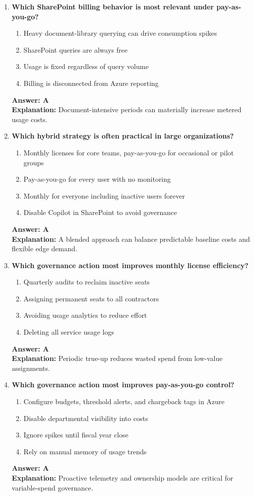 \documentclass[10pt]{article}
\begin{document}
\begin{enumerate}[leftmargin=*]
\item \textbf{Which SharePoint billing behavior is most relevant under pay-as-you-go?}
\begin{enumerate}[label=\Alph*.]
  \item Heavy document-library querying can drive consumption spikes
  \item SharePoint queries are always free
  \item Usage is fixed regardless of query volume
  \item Billing is disconnected from Azure reporting
\end{enumerate}
\textbf{Answer: A}\\
\textbf{Explanation:} Document-intensive periods can materially increase metered usage costs.

\item \textbf{Which hybrid strategy is often practical in large organizations?}
\begin{enumerate}[label=\Alph*.]
  \item Monthly licenses for core teams, pay-as-you-go for occasional or pilot groups
  \item Pay-as-you-go for every user with no monitoring
  \item Monthly for everyone including inactive users forever
  \item Disable Copilot in SharePoint to avoid governance
\end{enumerate}
\textbf{Answer: A}\\
\textbf{Explanation:} A blended approach can balance predictable baseline costs and flexible edge demand.

\item \textbf{Which governance action most improves monthly license efficiency?}
\begin{enumerate}[label=\Alph*.]
  \item Quarterly audits to reclaim inactive seats
  \item Assigning permanent seats to all contractors
  \item Avoiding usage analytics to reduce effort
  \item Deleting all service usage logs
\end{enumerate}
\textbf{Answer: A}\\
\textbf{Explanation:} Periodic true-up reduces wasted spend from low-value assignments.

\item \textbf{Which governance action most improves pay-as-you-go control?}
\begin{enumerate}[label=\Alph*.]
  \item Configure budgets, threshold alerts, and chargeback tags in Azure
  \item Disable departmental visibility into costs
  \item Ignore spikes until fiscal year close
  \item Rely on manual memory of usage trends
\end{enumerate}
\textbf{Answer: A}\\
\textbf{Explanation:} Proactive telemetry and ownership models are critical for variable-spend governance.


\end{enumerate}
\end{document}

